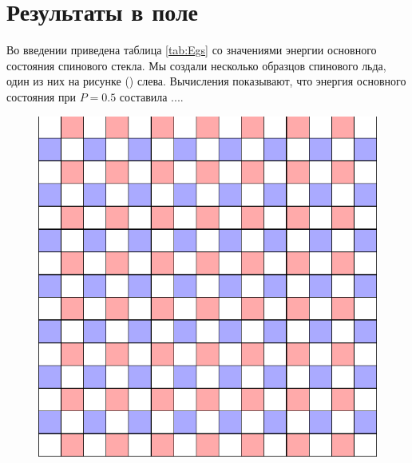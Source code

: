 \documentclass[utf8, babel, sor, jor, amsmath, amssymb, reprint]{elsarticle} %
\begin{document}
\section{Результаты в поле}

Во введении приведена таблица \ref{tab:Egs} со значениями энергии основного состояния спинового стекла. Мы создали несколько образцов спинового льда, один из них на рисунке (\label{fig:cell_SI_SG}) слева. Вычисления показывают, что энергия основного состояния при $P=0.5$ составила ....

\begin{figure}[H]
	\begin{minipage}[h]{0.45\linewidth}
		\includegraphics[width=1\linewidth]{cell_SI_64_J0_1.png}
	\end{minipage}
	\hfill
	\begin{minipage}[h]{0.45\linewidth}

\end{minipage}
\end{figure}
\end{document}
